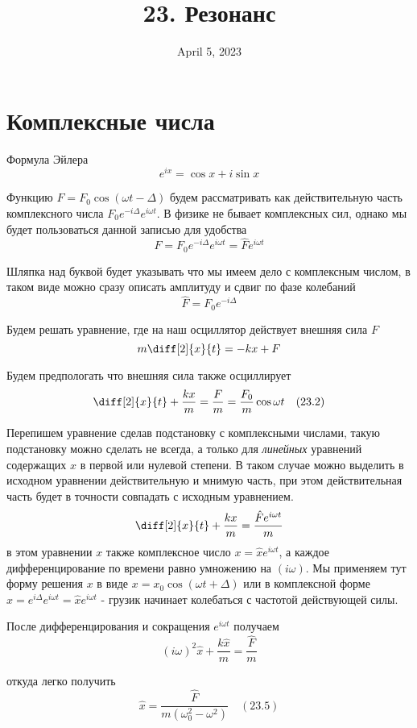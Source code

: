 \documentclass[12pt]{article}
\date{April 5, 2023}
\title{23. Резонанс}
\begin{document}
\maketitle

\section{Комплексные числа}

Формула Эйлера
\[
    e^{ix}=\cos x+i\sin x
\]

Функцию $F=F_0 \cos(\omega t-\Delta)$ будем рассматривать как действительную часть комплексного числа $F_0 e^{-i \Delta} e^{i \omega t}$. В физике не бывает комплексных сил, однако мы будет пользоваться данной записью для удобства
\[
    F=F_0 e^{-i \Delta} e^{i \omega t} = \hat{F} e^{i \omega t}
\]

Шляпка над буквой будет указывать что мы имеем дело с комплексным числом, в таком виде можно сразу описать амплитуду и сдвиг по фазе колебаний
\[
    \hat{F}=F_0 e^{-i \Delta}
\]

Будем решать уравнение, где на наш осциллятор действует внешняя сила $F$
\[
    m\diff[2]{x}{t}=-kx + F
\]

Будем предпологать что внешняя сила также осциллирует
\[
    \diff[2]{x}{t}+\frac{kx}{m}=\frac{F}{m}=\frac{F_0}{m} \cos\omega t \quad (23.2)
\]


Перепишем уравнение сделав подстановку с комплексными числами, такую подстановку можно сделать не всегда, а только для \textit{линейных} уравнений содержащих $x$ в первой или нулевой степени. В таком случае можно выделить в исходном уравнении действительную и мнимую часть, при этом действительная часть будет в точности совпадать с исходным уравнением.
\[
    \diff[2]{x}{t}+\frac{kx}{m}=\frac{\hat{F} e^{i \omega t}}{m}
\]
в этом уравнении $x$ также комплексное число $x=\hat{x} e^{i \omega t}$, а каждое дифференцирование по времени равно умножению на $(i \omega)$. Мы применяем тут форму решения $x$ в виде $x=x_0\cos(\omega t+\Delta)$ или в комплексной форме $x=e^{i \Delta} e^{i \omega t} = \hat{x} e^{i \omega t}$ - грузик начинает колебаться с частотой действующей силы.

После дифференцирования и сокращения $e^{i \omega t}$ получаем
\[
    (i \omega)^2 \hat{x} + \frac{k\hat{x}}{m} = \frac{\hat{F}}{m}
\]

откуда легко получить
\[
    \hat{x} = \frac{\hat{F}}{m(\omega_0^2-\omega^2)} \quad (23.5)
\]
\end{document}
